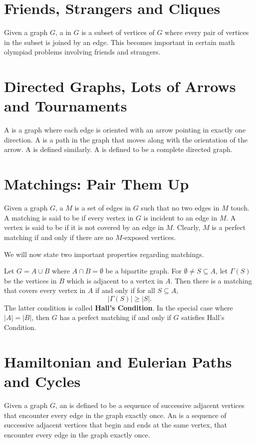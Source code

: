 \section{Friends, Strangers and Cliques}
Given a graph $G$, a  in $G$ is a subset of vertices of $G$ where every pair of vertices in the subset is joined by an edge. This becomes important in certain math olympiad problems involving friends and strangers.

\section{Directed Graphs, Lots of Arrows and Tournaments}
A  is a graph where each edge is oriented with an arrow pointing in exactly one direction. A  is a path in the graph that moves along with the orientation of the arrow. A  is defined similarly. A  is defined to be a complete directed graph.

\section{Matchings: Pair Them Up}
Given a graph $G$, a  $M$ is a set of edges in $G$ such that no two edges in $M$ touch. A matching is said to be  if every vertex in $G$ is incident to an edge in $M$. A vertex is said to be  if it is not covered by an edge in $M$. Clearly, $M$ is a perfect matching if and only if there are no $M$-exposed vertices.

We will now state two important properties regarding matchings.

\begin{theorem}
Let $G=A\cup B$ where $A\cap B=\emptyset$ be a bipartite graph. For $\emptyset\neq S\subseteq A$, let $\Gamma(S)$ be the vertices in $B$ which is adjacent to a vertex in $A$. Then there is a matching that covers every vertex in $A$ if and only if for all $S\subseteq A$,
\[ |\Gamma(S)|\ge|S|. \]
The latter condition is called \textbf{Hall's Condition}. In the special case where $|A|=|B|$, then $G$ has a perfect matching if and only if $G$ satisfies Hall's Condition.
\end{theorem}

\section{Hamiltonian and Eulerian Paths and Cycles}
Given a graph $G$, an  is defined to be a sequence of successive adjacent vertices that encounter every edge in the graph exactly once. An  is a sequence of successive adjacent vertices that begin and ends at the same vertex, that encounter every edge in the graph exactly once.

